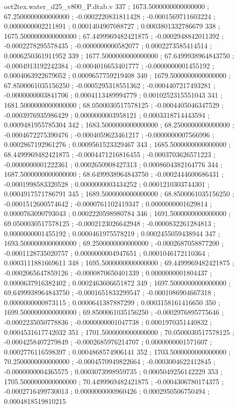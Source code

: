 \begin{filecontents}[overwrite]{oct2tex.water_d25_v800_P.dtab.v}
337 ; 1673.5000000000000000 ; 67.2500000000000000 ; -0.0002220831811428 ; -0.0001569711603224 ; 0.0000000002211891 ; 0.0001404907088727 ; 0.0003801332786679
338 ; 1675.5000000000000000 ; 67.4499969482421875 ; -0.0002948842011392 ; -0.0002278295578435 ; -0.0000000000582077 ; 0.0002273585414514 ; 0.0006250361911952
339 ; 1677.5000000000000000 ; 67.6499938964843750 ; -0.0004913192242384 ; -0.0004016653401777 ; -0.0000000001455192 ; 0.0004063922679052 ; 0.0009657759219408
340 ; 1679.5000000000000000 ; 67.8500061035156250 ; -0.0005295318551362 ; -0.0004407217493281 ; -0.0000000003841706 ; 0.0004113489994779 ; 0.0010252315551043
341 ; 1681.5000000000000000 ; 68.0500030517578125 ; -0.0004405046347529 ; -0.0003976935986429 ; 0.0000000003958121 ; 0.0003318714443594 ; 0.0009481955785304
342 ; 1683.5000000000000000 ; 68.2500000000000000 ; -0.0004672275390476 ; -0.0004059623461217 ; -0.0000000007566996 ; 0.0002867192961276 ; 0.0009561523329467
343 ; 1685.5000000000000000 ; 68.4499969482421875 ; -0.0004471216816455 ; -0.0003703626571223 ; -0.0000000001222361 ; 0.0002650908427313 ; 0.0008604382164776
344 ; 1687.5000000000000000 ; 68.6499938964843750 ; -0.0002444600686431 ; -0.0001998583320528 ; 0.0000000003434252 ; 0.0001210303744301 ; 0.0004917571786791
345 ; 1689.5000000000000000 ; 68.8500061035156250 ; -0.0001512600574642 ; -0.0000761102419347 ; 0.0000000001629814 ; 0.0000763090793043 ; 0.0002220598980784
346 ; 1691.5000000000000000 ; 69.0500030517578125 ; -0.0002123026642948 ; -0.0000832261284813 ; 0.0000000001455192 ; 0.0000461975578219 ; 0.0002455059438944
347 ; 1693.5000000000000000 ; 69.2500000000000000 ; -0.0002687058877200 ; -0.0001128735020757 ; 0.0000000004947651 ; 0.0001046172110364 ; 0.0003111881669611
348 ; 1695.5000000000000000 ; 69.4499969482421875 ; -0.0002065647859126 ; -0.0000870650401339 ; 0.0000000001804437 ; 0.0000637916382402 ; 0.0002463606651872
349 ; 1697.5000000000000000 ; 69.6499938964843750 ; -0.0001651833299547 ; -0.0001086904667318 ; 0.0000000000873115 ; 0.0000641387887299 ; 0.0003158161416650
350 ; 1699.5000000000000000 ; 69.8500061035156250 ; -0.0002976895775646 ; -0.0002235050778836 ; -0.0000000001047738 ; 0.0001970351440832 ; 0.0004531617742032
351 ; 1701.5000000000000000 ; 70.0500030517578125 ; -0.0004258407279849 ; -0.0002685976214707 ; 0.0000000001571607 ; 0.0002776116598397 ; 0.0004868574906141
352 ; 1703.5000000000000000 ; 70.2500000000000000 ; -0.0004570949822664 ; -0.0003004622412845 ; -0.0000000004365575 ; 0.0003073998959735 ; 0.0005049256142229
353 ; 1705.5000000000000000 ; 70.4499969482421875 ; -0.0004306780174375 ; -0.0002716499730013 ; 0.0000000000960426 ; 0.0002950506750494 ; 0.0004818519810215

\end{filecontents}
